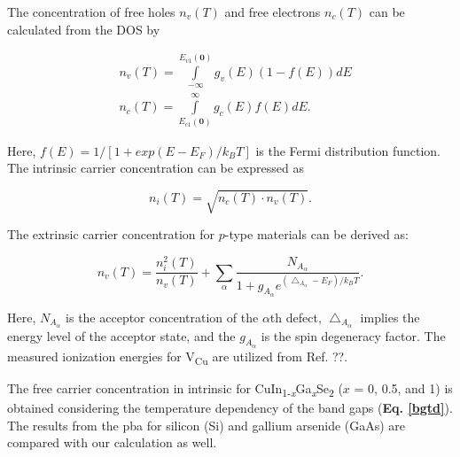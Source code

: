 \documentclass[a4paper, 12pt, titlepage,oneside,drop]{kthesis}
\begin{document}

The concentration of free holes $n_v(T)$ and free electrons $n_c(T)$ can be calculated from the DOS by

\begin{equation}
\begin{split}
& n_v(T) = \int \limits_{-\infty}^{E_{v1}(\textbf{0})} g_v(E)(1-f(E))dE\\
& n_c(T) = \int \limits_{E_{c1}(\textbf{0})}^{\infty} g_c(E)f(E)dE.
\end{split}
\end{equation}

Here, $f(E) = 1/[1+exp{(E-E_F)/k_BT}]$ is the Fermi distribution function. The intrinsic carrier concentration can be expressed as

\begin{equation}\label{cc}
 n_i(T) = \sqrt{n_c(T) \cdot n_v(T)}.
\end{equation}
 
The extrinsic carrier concentration for $p$-type materials can be derived as:

\begin{equation}\label{ecc}
n_v(T) = \frac{n_i^2(T)}{n_v(T)} + \sum \limits_{\alpha} \frac{N_{A_{\alpha}}} {1+g_{A_{\alpha}} e^{ (\bigtriangleup_{A_{\alpha}}-E_F)/k_BT }}. 
\end{equation}

Here, $N_{A_{\alpha}}$ is the acceptor concentration of the $\alpha$th defect, $\bigtriangleup_{A_{\alpha}}$ implies the energy level of the acceptor state, and the $g_{A_{\alpha}}$
 is the spin degeneracy factor. The measured ionization energies for V\textsubscript{Cu} are utilized from Ref. ??.

The free carrier concentration in intrinsic for {CuIn\textsubscript{1-\textit{x}}Ga\textsubscript{\textit{x}}Se\textsubscript{2}} ($x$ = 0, 0.5, and 1) is obtained considering the temperature dependency of the band gaps (\textbf{Eq. \ref{bgtd}}).
The results from the pba for silicon (Si) and gallium arsenide (GaAs) are compared with our calculation as well.
\end{document}
